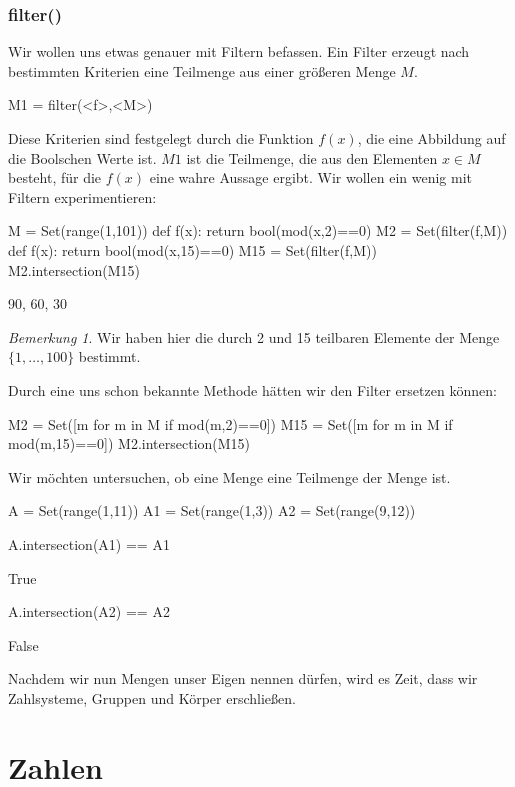 \documentclass[fontsize=12pt,paper=a4,twoside,bibtotoc,idxtotoc,
liststotoc,pagesize,BCOR1.2cm,DIV15,chapterprefix,pagesize=pdftex]{scrbook}
\theoremstyle{plain}
\theoremstyle{definition}
\theoremstyle{remark}
\newtheorem{bem}[equation]{Bemerkung}
\begin{document}
\subsubsection{filter()}
Wir wollen uns etwas genauer mit Filtern befassen. Ein Filter erzeugt nach bestimmten Kriterien eine Teilmenge aus einer größeren Menge $M$.
\begin{sagein}
M1 = filter(<f>,<M>)
\end{sagein}
Diese Kriterien sind festgelegt durch die Funktion $f(x)$, die eine Abbildung auf die Boolschen Werte  ist. 
$M1$ ist die Teilmenge, die aus den Elementen $x\in M$ besteht, für die $f(x)$ eine wahre Aussage ergibt. Wir wollen ein wenig mit Filtern experimentieren:
\begin{sagein}
M = Set(range(1,101))
def f(x): return bool(mod(x,2)==0)
M2 = Set(filter(f,M))
def f(x): return bool(mod(x,15)==0)
M15 = Set(filter(f,M))
M2.intersection(M15)
\end{sagein} 
\begin{sageout}
 {90, 60, 30}
\end{sageout}
\begin{bem}
 Wir haben hier die durch 2 und 15 teilbaren Elemente der Menge $\{1,\ldots,100\}$ bestimmt.
\end{bem}
Durch eine uns schon bekannte Methode hätten wir den Filter ersetzen können:
\begin{sagein}
M2 = Set([m for m in M if mod(m,2)==0])
M15 = Set([m for m in M if mod(m,15)==0])
M2.intersection(M15)
\end{sagein}
Wir möchten untersuchen, ob eine Menge  eine Teilmenge der Menge  ist.
\begin{sagein}
A = Set(range(1,11))
A1 = Set(range(1,3))
A2 = Set(range(9,12))
\end{sagein}
\begin{sagein}
A.intersection(A1) == A1
\end{sagein}
\begin{sageout}
  True
\end{sageout}
\begin{sagein}
A.intersection(A2) == A2
\end{sagein}
\begin{sageout}
  False
\end{sageout}
Nachdem wir nun Mengen unser Eigen nennen dürfen, wird es Zeit, dass wir Zahlsysteme, Gruppen und Körper erschließen.
\section{Zahlen}
\end{document}
